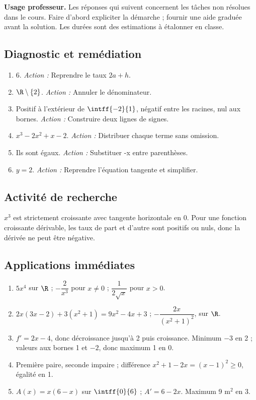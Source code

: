 \label{C06-CORR}
\textbf{Usage professeur.} Les réponses qui suivent concernent les tâches non résolues dans le cours. Faire d’abord expliciter la démarche ; fournir une aide graduée avant la solution. Les durées sont des estimations à étalonner en classe.
\subsection*{Diagnostic et remédiation}
\begin{enumerate}
\item $6$. \textit{Action :} Reprendre le taux $2a+h$.
\item $\R\setminus\{2\}$. \textit{Action :} Annuler le dénominateur.
\item Positif à l’extérieur de $\intff{-2}{1}$, négatif entre les racines, nul aux bornes. \textit{Action :} Construire deux lignes de signes.
\item $x^3-2x^2+x-2$. \textit{Action :} Distribuer chaque terme sans omission.
\item Ils sont égaux. \textit{Action :} Substituer -x entre parenthèses.
\item $y=2$. \textit{Action :} Reprendre l’équation tangente et simplifier.
\end{enumerate}
\subsection*{Activité de recherche}
$x^3$ est strictement croissante avec tangente horizontale en 0. Pour une fonction croissante dérivable, les taux de part et d’autre sont positifs ou nuls, donc la dérivée ne peut être négative.
\subsection*{Applications immédiates}
\begin{enumerate}
\item $5x^4$ sur $\R$ ; $-\dfrac{2}{x^3}$ pour $x\ne0$ ; $\dfrac{1}{2\sqrt x}$ pour $x>0$.
\item $2x(3x-2)+3(x^2+1)=9x^2-4x+3$ ; $-\dfrac{2x}{(x^2+1)^2}$, sur $\R$.
\item $f\prime=2x-4$, donc décroissance jusqu’à 2 puis croissance. Minimum $-3$ en 2 ; valeurs aux bornes 1 et $-2$, donc maximum 1 en 0.
\item Première paire, seconde impaire ; différence $x^2+1-2x=(x-1)^2\geq0$, égalité en 1.
\item $A(x)=x(6-x)$ sur $\intff{0}{6}$ ; $A\prime=6-2x$. Maximum 9 m$^2$ en 3.
\end{enumerate}
